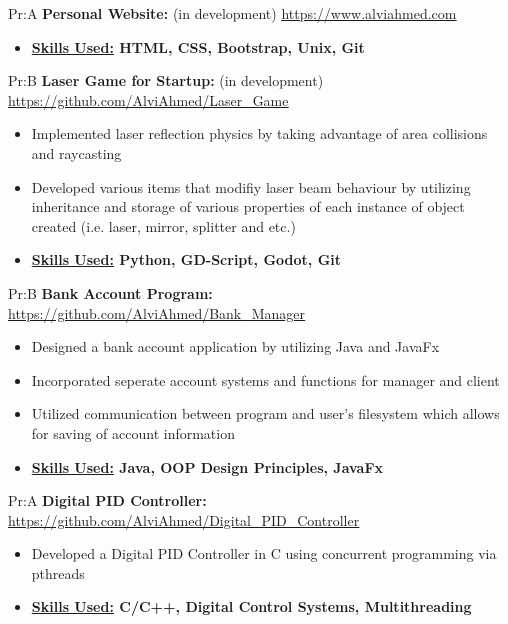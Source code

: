 

Pr:A
\textbf{Personal Website: }  (in development) \underline{\url{https://www.alviahmed.com}}
\begin{itemize}[noitemsep,nolistsep]
\item \textbf{\underline{Skills Used:} HTML, CSS, Bootstrap, Unix, Git}
\end{itemize}


Pr:B
\textbf{Laser Game for Startup: } (in development) \underline{\url{https://github.com/AlviAhmed/Laser_Game}}
\begin{itemize}[noitemsep,nolistsep]
\item Implemented laser reflection physics by taking advantage of area collisions and raycasting
\item Developed various items that modifiy laser beam behaviour by utilizing inheritance and storage of
  various properties of each instance of object created (i.e. laser, mirror, splitter and etc.)
\item \textbf{\underline{Skills Used:} Python, GD-Script, Godot, Git}
\end{itemize}


Pr:B
\textbf{Bank Account Program: }
\underline{\url{https://github.com/AlviAhmed/Bank_Manager}}
\begin{itemize}[noitemsep,nolistsep]
\item Designed a bank account application by utilizing Java and JavaFx
\item Incorporated seperate account systems and functions for manager and client 
\item Utilized communication between program and user's filesystem which allows for saving of account information 
\item \textbf{\underline{Skills Used:} Java, OOP Design Principles, JavaFx}
\end{itemize}
\vspace{1em}




Pr:A
\vspace{\spaces}
\textbf{Digital PID Controller: } \underline{\url{https://github.com/AlviAhmed/Digital_PID_Controller}}
\begin{itemize}[noitemsep,nolistsep]
\item Developed a Digital PID Controller in C using concurrent programming via pthreads
\item \textbf{ \underline{Skills Used:} C/C++, Digital Control Systems, Multithreading}
\end{itemize}

